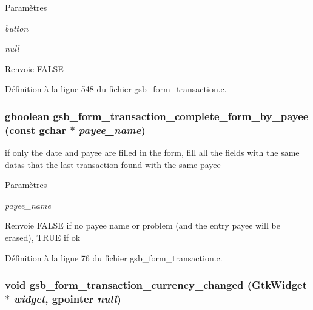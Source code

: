 \begin{DoxyParams}{Paramètres}
\item[{\em button}]\item[{\em null}]\end{DoxyParams}
\begin{DoxyReturn}{Renvoie}
FALSE 
\end{DoxyReturn}


Définition à la ligne 548 du fichier gsb\_\-form\_\-transaction.c.

\subsubsection[{gsb\_\-form\_\-transaction\_\-complete\_\-form\_\-by\_\-payee}]{\setlength{\rightskip}{0pt plus 5cm}gboolean gsb\_\-form\_\-transaction\_\-complete\_\-form\_\-by\_\-payee (const gchar $\ast$ {\em payee\_\-name})}\label{gsb__form__transaction_8h_a97f907f396b67e7383c6e3ff747e4277}
if only the date and payee are filled in the form, fill all the fields with the same datas that the last transaction found with the same payee


\begin{DoxyParams}{Paramètres}
\item[{\em payee\_\-name}]\end{DoxyParams}
\begin{DoxyReturn}{Renvoie}
FALSE if no payee name or problem (and the entry payee will be erased), TRUE if ok 
\end{DoxyReturn}


Définition à la ligne 76 du fichier gsb\_\-form\_\-transaction.c.

\subsubsection[{gsb\_\-form\_\-transaction\_\-currency\_\-changed}]{\setlength{\rightskip}{0pt plus 5cm}void gsb\_\-form\_\-transaction\_\-currency\_\-changed (GtkWidget $\ast$ {\em widget}, \/  gpointer {\em null})}\label{gsb__form__transaction_8h_a4b5641da00b228399e4ac1d5919776c5}


